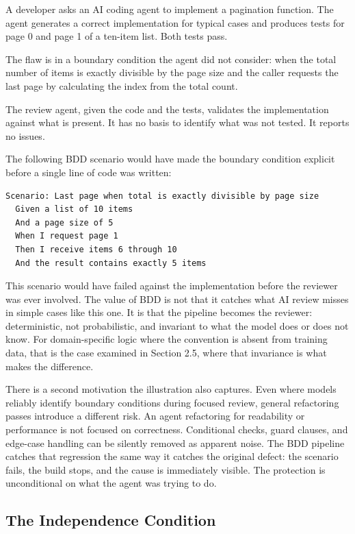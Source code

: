 \documentclass{article}
\begin{document}
A developer asks an AI coding agent to implement a pagination function.
The agent generates a correct implementation for typical cases and produces
tests for page 0 and page 1 of a ten-item list. Both tests pass.

The flaw is in a boundary condition the agent did not consider: when the
total number of items is exactly divisible by the page size and the caller
requests the last page by calculating the index from the total count.

The review agent, given the code and the tests, validates the
implementation against what is present. It has no basis to identify what
was not tested. It reports no issues.

The following BDD scenario would have made the boundary condition
explicit before a single line of code was written:

\begin{lstlisting}[language={},basicstyle=\ttfamily\footnotesize,columns=fullflexible,frame=single,breaklines=true]
Scenario: Last page when total is exactly divisible by page size
  Given a list of 10 items
  And a page size of 5
  When I request page 1
  Then I receive items 6 through 10
  And the result contains exactly 5 items
\end{lstlisting}

This scenario would have failed against the implementation before the
reviewer was ever involved. The value of BDD is not that it catches
what AI review misses in simple cases like this one. It is that the
pipeline becomes the reviewer: deterministic, not probabilistic, and
invariant to what the model does or does not know. For domain-specific
logic where the convention is absent from training data, that is the case
examined in Section 2.5, where that invariance is what makes the difference.

There is a second motivation the illustration also captures. Even where
models reliably identify boundary conditions during focused review, general
refactoring passes introduce a different risk. An agent refactoring for
readability or performance is not focused on correctness. Conditional
checks, guard clauses, and edge-case handling can be silently removed as
apparent noise. The BDD pipeline catches that regression the same way it
catches the original defect: the scenario fails, the build stops, and
the cause is immediately visible. The protection is unconditional on what
the agent was trying to do.

\subsection{The Independence Condition}
\end{document}
